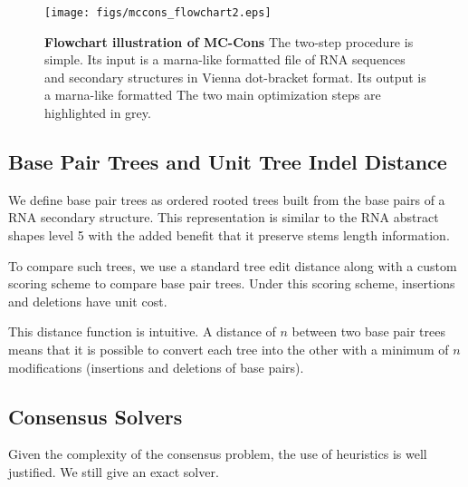 \documentclass[10pt,letterpaper]{article}
\begin{document}
\begin{figure}[h]
\begin{center}
\texttt{[image: figs/mccons\_flowchart2.eps]}
\caption{{\bf Flowchart illustration of MC-Cons}
The two-step procedure is simple. Its input is a marna-like formatted file of RNA sequences and secondary structures in Vienna dot-bracket format. Its output is a marna-like formatted  The two main optimization steps are highlighted in grey.}
\label{fig1}
\end{center}
\end{figure}


\subsection*{Base Pair Trees and Unit Tree Indel Distance}
We define base pair trees as ordered rooted trees built from the base pairs of a RNA secondary structure. This representation is similar to the RNA abstract shapes level 5 \cite{abstract_shapes} with the added benefit that it preserve stems length information.


\noindent To compare such trees, we use a standard tree edit distance \cite{zhang_shasha} along with a custom scoring scheme to compare base pair trees. Under this scoring scheme, insertions and deletions have unit cost.

\noindent This distance function is intuitive. A distance of $n$ between two base pair trees means that it is possible to convert each tree into the other with a minimum of $n$ modifications (insertions and deletions of base pairs).








\subsection*{Consensus Solvers}
Given the complexity of the consensus problem, the use of heuristics is well justified. We still give an exact solver.

\end{document}
